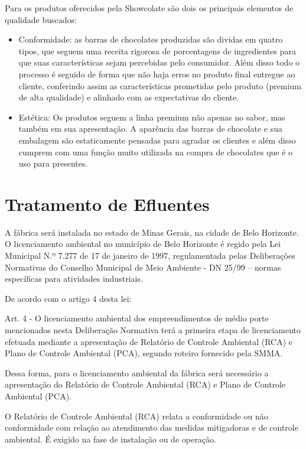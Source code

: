 \documentclass[
	12pt,				%
	openright,			%
	oneside,			%
	a4paper,			%
	english,			%
	french,				%
	spanish,			%
	brazil				%
	]{abntex2}
\begin{document}
Para os produtos oferecidos pela Showcolate são dois os principais elementos de qualidade buscados:

\begin{itemize}
\item Conformidade: as barras de chocolates produzidas são dividas em quatro tipos, que seguem uma receita rigorosa de porcentagens de ingredientes para que suas características sejam percebidas pelo consumidor. Além disso todo o processo é seguido de forma que não haja erros no produto final entregue ao cliente, conferindo assim as características prometidas pelo produto (premium de alta qualidade) e alinhado com as expectativas do cliente.
\item Estética: Os produtos seguem a linha premium não apenas no sabor, mas também em sua apresentação. A aparência das barras de chocolate e sua embalagem são estaticamente pensadas para agradar os clientes e além disso cumprem com uma função muito utilizada na compra de chocolates que é o uso para presentes.
\end{itemize}

\chapter{Tratamento de Efluentes}

A fábrica será instalada no estado de Minas Gerais, na cidade de Belo Horizonte. O licenciamento ambiental no município de Belo Horizonte é regido pela Lei Municipal N.º 7.277 de 17 de janeiro de 1997, regulamentada pelas Deliberações Normativas do Conselho Municipal de Meio Ambiente - DN 25/99 – normas específicas para atividades industriais.

De acordo com o artigo 4 desta lei:

Art. 4 - O licenciamento ambiental dos empreendimentos de médio porte mencionados nesta Deliberação Normativa terá a primeira etapa de licenciamento efetuada mediante a apresentação de Relatório de Controle Ambiental (RCA) e Plano de Controle Ambiental (PCA), segundo roteiro fornecido pela SMMA.

Dessa forma, para o licenciamento ambiental da fábrica será necessário a apresentação do Relatório de Controle Ambiental (RCA) e Plano de Controle Ambiental (PCA). 

O Relatório de Controle Ambiental (RCA) relata a conformidade ou não conformidade com relação ao atendimento das medidas mitigadoras e de controle ambiental. É exigido na fase de instalação ou de operação.
\end{document}
